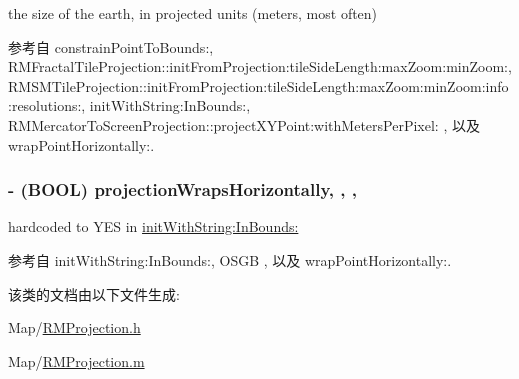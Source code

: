 the size of the earth, in projected units (meters, most often) 



参考自 constrain\-Point\-To\-Bounds\-:, R\-M\-Fractal\-Tile\-Projection\-::init\-From\-Projection\-:tile\-Side\-Length\-:max\-Zoom\-:min\-Zoom\-:, R\-M\-S\-M\-Tile\-Projection\-::init\-From\-Projection\-:tile\-Side\-Length\-:max\-Zoom\-:min\-Zoom\-:info\-:resolutions\-:, init\-With\-String\-:\-In\-Bounds\-:, R\-M\-Mercator\-To\-Screen\-Projection\-::project\-X\-Y\-Point\-:with\-Meters\-Per\-Pixel\-: , 以及 wrap\-Point\-Horizontally\-:.

\hypertarget{interface_r_m_projection_aa7aa460042ee6b011d23d20cc0eb1fa9}{
\subsubsection[{projection\-Wraps\-Horizontally}]{\setlength{\rightskip}{0pt plus 5cm}-\/ (B\-O\-O\-L) projection\-Wraps\-Horizontally\hspace{0.3cm}{\ttfamily [read]}, {\ttfamily [write]}, {\ttfamily [atomic]}, {\ttfamily [assign]}}}\label{interface_r_m_projection_aa7aa460042ee6b011d23d20cc0eb1fa9}


hardcoded to Y\-E\-S in \hyperlink{interface_r_m_projection_a3cb82d1e81597dd3a3039168d0be8d9c}{init\-With\-String\-:\-In\-Bounds\-:} 



参考自 init\-With\-String\-:\-In\-Bounds\-:, O\-S\-G\-B , 以及 wrap\-Point\-Horizontally\-:.



该类的文档由以下文件生成\-:\begin{DoxyCompactItemize}
\item 
Map/\hyperlink{_r_m_projection_8h}{R\-M\-Projection.\-h}\item 
Map/\hyperlink{_r_m_projection_8m}{R\-M\-Projection.\-m}\end{DoxyCompactItemize}
